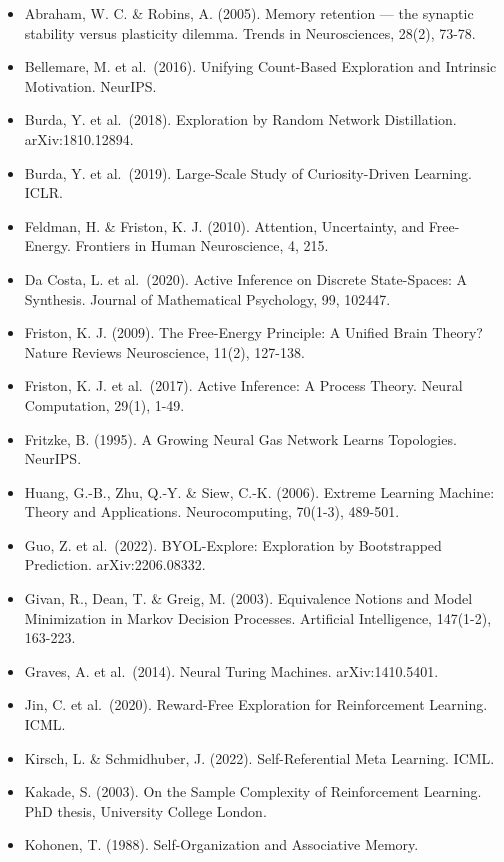 \documentclass[
  11pt,
]{article}
\providecommand{\tightlist}{%
  \setlength{\itemsep}{0pt}\setlength{\parskip}{0pt}}
\begin{document}
\begin{itemize}
\tightlist
\item
  Abraham, W. C. \& Robins, A. (2005). Memory retention --- the synaptic
  stability versus plasticity dilemma. Trends in Neurosciences, 28(2),
  73-78.
\item
  Bellemare, M. et al.~(2016). Unifying Count-Based Exploration and
  Intrinsic Motivation. NeurIPS.
\item
  Burda, Y. et al.~(2018). Exploration by Random Network Distillation.
  arXiv:1810.12894.
\item
  Burda, Y. et al.~(2019). Large-Scale Study of Curiosity-Driven
  Learning. ICLR.
\item
  Feldman, H. \& Friston, K. J. (2010). Attention, Uncertainty, and
  Free-Energy. Frontiers in Human Neuroscience, 4, 215.
\item
  Da Costa, L. et al.~(2020). Active Inference on Discrete State-Spaces:
  A Synthesis. Journal of Mathematical Psychology, 99, 102447.
\item
  Friston, K. J. (2009). The Free-Energy Principle: A Unified Brain
  Theory? Nature Reviews Neuroscience, 11(2), 127-138.
\item
  Friston, K. J. et al.~(2017). Active Inference: A Process Theory.
  Neural Computation, 29(1), 1-49.
\item
  Fritzke, B. (1995). A Growing Neural Gas Network Learns Topologies.
  NeurIPS.
\item
  Huang, G.-B., Zhu, Q.-Y. \& Siew, C.-K. (2006). Extreme Learning
  Machine: Theory and Applications. Neurocomputing, 70(1-3), 489-501.
\item
  Guo, Z. et al.~(2022). BYOL-Explore: Exploration by Bootstrapped
  Prediction. arXiv:2206.08332.
\item
  Givan, R., Dean, T. \& Greig, M. (2003). Equivalence Notions and Model
  Minimization in Markov Decision Processes. Artificial Intelligence,
  147(1-2), 163-223.
\item
  Graves, A. et al.~(2014). Neural Turing Machines. arXiv:1410.5401.
\item
  Jin, C. et al.~(2020). Reward-Free Exploration for Reinforcement
  Learning. ICML.
\item
  Kirsch, L. \& Schmidhuber, J. (2022). Self-Referential Meta Learning.
  ICML.
\item
  Kakade, S. (2003). On the Sample Complexity of Reinforcement Learning.
  PhD thesis, University College London.
\item
  Kohonen, T. (1988). Self-Organization and Associative Memory.

\end{itemize}
\end{document}
